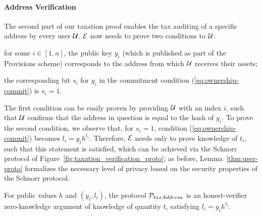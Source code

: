 \paragraph{Address Verification}\label{subsec:user-verification-proto}
The second part of our taxation proof enables the tax auditing of a specific
address by every user $\mathcal{U}$. $\mathcal{E}$ now needs to prove two conditions to
$\mathcal{U}$:
\begin{inparaenum}[i)]
    \item for some $i \in [1, n]$, the public key $y_i$ (which is published as
        part of the Provisions scheme) corresponds to the address from which
        $\mathcal{U}$ receives their assets;
    \item the corresponding bit $s_i$ for $y_i$ in the commitment condition
        (\ref{eq:ownership-commit}) is $s_i = 1$.
\end{inparaenum}
The first condition can be easily proven by providing $\mathcal{U}$ with an index
$i$, such that $\mathcal{U}$ confirms that the address in question is equal to the
hash of $y_i$. To prove the second condition, we observe that, for $s_i = 1$,
condition (\ref{eq:ownership-commit}) becomes
$l_i = y_ih^{t_i}$.
Therefore, $\mathcal{E}$ needs only to prove knowledge of $t_i$, such that this
statement is satisfied, which can be achieved via the Schnorr protocol
of Figure~\ref{fig:taxation_verification_proto}; as before,
Lemma~\ref{thm:user-proto} formalizes the necessary level of privacy based on
the security properties of the Schnorr protocol.


\begin{lemma}\label{thm:user-proto}
    For public values $h$ and $(y_i, l_i)$, the protocol
    $\mathcal{P}_{taxAddress}$ is an honest-verifier zero-knowledge argument of
    knowledge of quantity $t_i$ satisfying $l_i = y_ih^{t_i}$.
\end{lemma}

